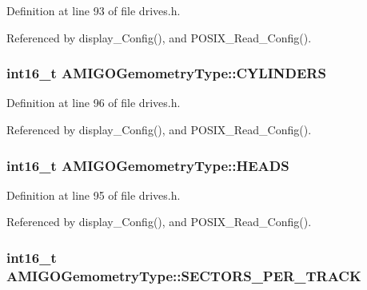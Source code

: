 Definition at line 93 of file drives.\+h.



Referenced by display\+\_\+\+Config(), and P\+O\+S\+I\+X\+\_\+\+Read\+\_\+\+Config().

\subsubsection[{\texorpdfstring{C\+Y\+L\+I\+N\+D\+E\+RS}{CYLINDERS}}]{\setlength{\rightskip}{0pt plus 5cm}int16\+\_\+t A\+M\+I\+G\+O\+Gemometry\+Type\+::\+C\+Y\+L\+I\+N\+D\+E\+RS}\hypertarget{structAMIGOGemometryType_a4282aeb6c4aac3b8cfc09e29402dcd3f}{}\label{structAMIGOGemometryType_a4282aeb6c4aac3b8cfc09e29402dcd3f}


Definition at line 96 of file drives.\+h.



Referenced by display\+\_\+\+Config(), and P\+O\+S\+I\+X\+\_\+\+Read\+\_\+\+Config().

\subsubsection[{\texorpdfstring{H\+E\+A\+DS}{HEADS}}]{\setlength{\rightskip}{0pt plus 5cm}int16\+\_\+t A\+M\+I\+G\+O\+Gemometry\+Type\+::\+H\+E\+A\+DS}\hypertarget{structAMIGOGemometryType_a33131d3948935e2064af9af151653033}{}\label{structAMIGOGemometryType_a33131d3948935e2064af9af151653033}


Definition at line 95 of file drives.\+h.



Referenced by display\+\_\+\+Config(), and P\+O\+S\+I\+X\+\_\+\+Read\+\_\+\+Config().

\subsubsection[{\texorpdfstring{S\+E\+C\+T\+O\+R\+S\+\_\+\+P\+E\+R\+\_\+\+T\+R\+A\+CK}{SECTORS_PER_TRACK}}]{\setlength{\rightskip}{0pt plus 5cm}int16\+\_\+t A\+M\+I\+G\+O\+Gemometry\+Type\+::\+S\+E\+C\+T\+O\+R\+S\+\_\+\+P\+E\+R\+\_\+\+T\+R\+A\+CK}\hypertarget{structAMIGOGemometryType_a9ac647c76bd331ab5b1fd22a4f5b9a4a}{}\label{structAMIGOGemometryType_a9ac647c76bd331ab5b1fd22a4f5b9a4a}


